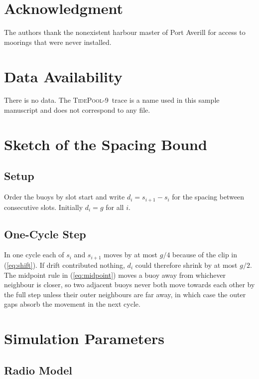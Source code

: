 \documentclass[conference]{IEEEtran}
\newcommand{\dataset}{\textsc{TidePool-9}}
\begin{document}
\section*{Acknowledgment}

The authors thank the nonexistent harbour master of Port Averill for access to
moorings that were never installed.

\section*{Data Availability}

There is no data. The \dataset\ trace is a name used in this sample manuscript
and does not correspond to any file.

\appendices

\section{Sketch of the Spacing Bound}
\label{app:proof}

\subsection{Setup}
\label{app:proof-setup}

Order the buoys by slot start and write $d_i = s_{i+1} - s_i$ for the spacing
between consecutive slots. Initially $d_i = g$ for all $i$.

\subsection{One-Cycle Step}
\label{app:proof-step}

In one cycle each of $s_i$ and $s_{i+1}$ moves by at most $g/4$ because of the
clip in (\ref{eq:shift}). If drift contributed nothing, $d_i$ could therefore
shrink by at most $g/2$. The midpoint rule in (\ref{eq:midpoint}) moves a buoy
away from whichever neighbour is closer, so two adjacent buoys never both move
towards each other by the full step unless their outer neighbours are far away,
in which case the outer gaps absorb the movement in the next cycle.

\section{Simulation Parameters}
\label{app:params}

\subsection{Radio Model}
\label{app:params-radio}
\end{document}

